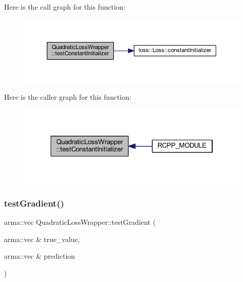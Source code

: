 Here is the call graph for this function\+:\nopagebreak
\begin{figure}[H]
\begin{center}
\leavevmode
\includegraphics[width=350pt]{class_quadratic_loss_wrapper_a0ed64adb364d6c2c1a0795672c7eb53e_cgraph}
\end{center}
\end{figure}
Here is the caller graph for this function\+:\nopagebreak
\begin{figure}[H]
\begin{center}
\leavevmode
\includegraphics[width=322pt]{class_quadratic_loss_wrapper_a0ed64adb364d6c2c1a0795672c7eb53e_icgraph}
\end{center}
\end{figure}
\mbox{\label{class_quadratic_loss_wrapper_a9154647dbe336faf38e0fdfb3f30173d}} 
\subsubsection{\texorpdfstring{test\+Gradient()}{testGradient()}}
{\footnotesize\ttfamily arma\+::vec Quadratic\+Loss\+Wrapper\+::test\+Gradient (\begin{DoxyParamCaption}\item[{arma\+::vec \&}]{true\+\_\+value,  }\item[{arma\+::vec \&}]{prediction }\end{DoxyParamCaption})\hspace{0.3cm}{\ttfamily [inline]}}

